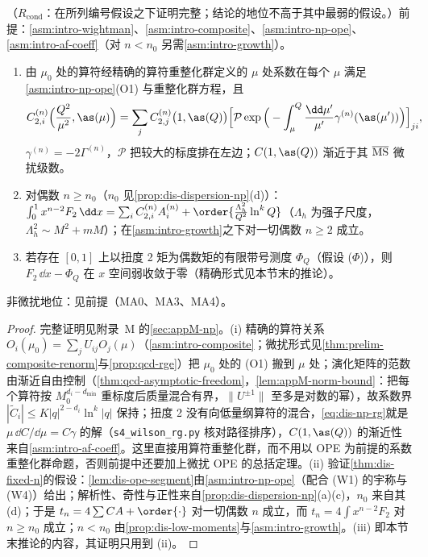 \begin{theorem}\label{thm:dis-moments-np}
（$R_{\mathrm{cond}}$：在所列编号假设之下证明完整；结论的地位不高于其中最弱的假设。）前提：\cref{asm:intro-wightman}、\cref{asm:intro-composite}、\cref{asm:intro-np-ope}、\cref{asm:intro-af-coeff}（对 $n<n_0$ 另需\cref{asm:intro-growth}）。
\begin{enumerate}[label=(\roman*),leftmargin=2.2em,itemsep=0pt,topsep=2pt]
\item 由 $\mu_0$ 处的算符经精确的算符重整化群定义的 $\mu$ 处系数在每个 $\mu$ 满足\cref{asm:intro-np-ope}(O1) 与重整化群方程，且
\begin{equation}\label{eq:dis-np-rg}
C^{(n)}_{2,i}\Big(\frac{Q^2}{\mu^2},\as(\mu)\Big)=\sum_jC^{(n)}_{2,j}\big(1,\as(Q)\big)\Big[\mathcal P\exp\Big(-\int_\mu^Q\frac{\dd\mu'}{\mu'}\gamma^{(n)}(\as(\mu'))\Big)\Big]_{ji},
\end{equation}
$\gamma^{(n)}=-2\Gamma^{(n)}$，$\mathcal P$ 把较大的标度排在左边；$C(1,\as(Q))$ 渐近于其 $\overline{\rm MS}$ 微扰级数。
\item 对偶数 $n\ge n_0$（$n_0$ 见\cref{prop:dis-dispersion-np}(d)）：$\int_0^1x^{n-2}F_2\,\dd x=\sum_iC^{(n)}_{2,i}A^{(n)}_i+\order{\frac{\Lambda_h^2}{Q^2}\ln^kQ}$（$\Lambda_h$ 为强子尺度，$\Lambda_h^2\sim M^2+mM$）；在\cref{asm:intro-growth}之下对一切偶数 $n\ge2$ 成立。
\item 若存在 $[0,1]$ 上以扭度 2 矩为偶数矩的有限带号测度 $\Phi_Q$（假设 ($\Phi$)），则 $F_2\,\dd x-\Phi_Q$ 在 $x$ 空间弱收敛于零（精确形式见本节末的推论）。
\end{enumerate}
非微扰地位：见前提（MA0、MA3、MA4）。
\end{theorem}

\begin{proof}
完整证明见附录~M 的\cref{sec:appM-np}。(i) 精确的算符关系 $O_i(\mu_0)=\sum_jU_{ij}O_j(\mu)$（\cref{asm:intro-composite}；微扰形式见\cref{thm:prelim-composite-renorm}与\cref{prop:qcd-rge}）把 $\mu_0$ 处的 (O1) 搬到 $\mu$ 处；演化矩阵的范数由渐近自由控制（\cref{thm:qcd-asymptotic-freedom}，\cref{lem:appM-norm-bound}：把每个算符按 $M_0^{d_i-d_{\min}}$ 重标度后质量混合有界，$\|U^{\pm1}\|$ 至多是对数的幂），故系数界 $|\tilde C_i|\le K|q|^{2-d_i}\ln^k|q|$ 保持；扭度 2 没有向低量纲算符的混合，\cref{eq:dis-np-rg}就是 $\mu\,\dd C/\dd\mu=C\gamma$ 的解（\texttt{s4\_wilson\_rg.py} 核对路径排序），$C(1,\as(Q))$ 的渐近性来自\cref{asm:intro-af-coeff}。这里直接用算符重整化群，而不用以 OPE 为前提的系数重整化群命题，否则前提中还要加上微扰 OPE 的总括定理。(ii) 验证\cref{thm:dis-fixed-n}的假设：\cref{lem:dis-ope-segment}由\cref{asm:intro-np-ope}（配合 (W1) 的宇称与 (W4)）给出；解析性、奇性与正性来自\cref{prop:dis-dispersion-np}(a)(c)，$n_0$ 来自其 (d)；于是 $t_n=4\sum CA+\order{\cdot}$ 对一切偶数 $n$ 成立，而 $t_n=4\int x^{n-2}F_2$ 对 $n\ge n_0$ 成立；$n<n_0$ 由\cref{prop:dis-low-moments}与\cref{asm:intro-growth}。(iii) 即本节末推论的内容，其证明只用到 (ii)。
\end{proof}

